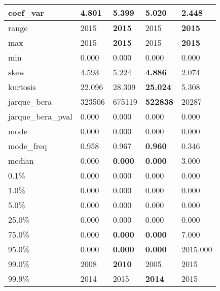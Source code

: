 \begin{table}[H]
\begin{tabular}{|l|m{10em}|m{10em}|m{10em}|m{10em}|}
\hline coef\_var & 4.801 & 5.399 & \bfseries 5.020 & \cellcolor[rgb]{0.9, 0.54, 0.52} 2.448 \\
\hline range & 2015 & \bfseries 2015 & \cellcolor[rgb]{0.9, 0.54, 0.52} 2015 & \bfseries 2015 \\
\hline max & 2015 & \bfseries 2015 & \cellcolor[rgb]{0.9, 0.54, 0.52} 2015 & \bfseries 2015 \\
\hline min & 0.000 & 0.000 & 0.000 & 0.000 \\
\hline skew & 4.593 & 5.224 & \bfseries 4.886 & \cellcolor[rgb]{0.9, 0.54, 0.52} 2.074 \\
\hline kurtosis & 22.096 & 28.309 & \bfseries 25.024 & \cellcolor[rgb]{0.9, 0.54, 0.52} 5.308 \\
\hline jarque\_bera & 323506 & \cellcolor[rgb]{0.9, 0.54, 0.52} 675119 & \bfseries 522838 & 20287 \\
\hline jarque\_bera\_pval & 0.000 & 0.000 & 0.000 & 0.000 \\
\hline mode & 0.000 & 0.000 & 0.000 & 0.000 \\
\hline mode\_freq & 0.958 & 0.967 & \bfseries 0.960 & \cellcolor[rgb]{0.9, 0.54, 0.52} 0.346 \\
\hline median & 0.000 & \bfseries 0.000 & \bfseries 0.000 & \cellcolor[rgb]{0.9, 0.54, 0.52} 3.000 \\
\hline 0.1\% & 0.000 & 0.000 & 0.000 & 0.000 \\
\hline 1.0\% & 0.000 & 0.000 & 0.000 & 0.000 \\
\hline 5.0\% & 0.000 & 0.000 & 0.000 & 0.000 \\
\hline 25.0\% & 0.000 & 0.000 & 0.000 & 0.000 \\
\hline 75.0\% & 0.000 & \bfseries 0.000 & \bfseries 0.000 & \cellcolor[rgb]{0.9, 0.54, 0.52} 7.000 \\
\hline 95.0\% & 0.000 & \bfseries 0.000 & \bfseries 0.000 & \cellcolor[rgb]{0.9, 0.54, 0.52} 2015.000 \\
\hline 99.0\% & 2008 & \bfseries 2010 & 2005 & \cellcolor[rgb]{0.9, 0.54, 0.52} 2015 \\
\hline 99.9\% & 2014 & \cellcolor[rgb]{0.9, 0.54, 0.52} 2015 & \bfseries 2014 & \cellcolor[rgb]{0.9, 0.54, 0.52} 2015 \\
\hline
\end{tabular}
\end{table}
